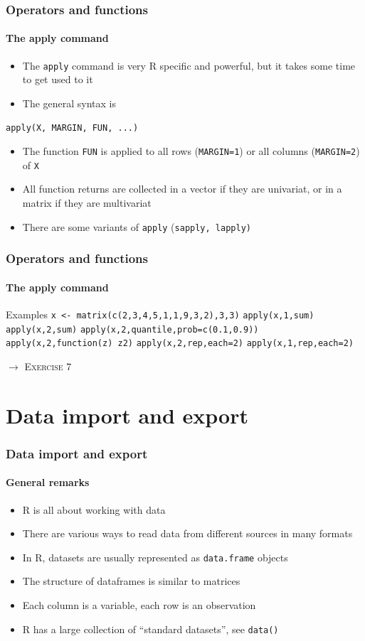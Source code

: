 \documentclass[title={Introduction to R}, author={Mutschler and Zaharieva}, inst={Institute for Econometrics and Empirical Economics}]{beamer}
\begin{document}
\begin{frame}
\frametitle{Operators and functions}
\framesubtitle{The apply command}
\begin{itemize}
\item The \texttt{apply} command is very R specific and powerful, but it takes some time to get used to it
\item The general syntax is
\end{itemize}
\begin{center}
\texttt{apply(X, MARGIN, FUN, ...)}
\end{center}

\begin{itemize}
\item The function \texttt{FUN} is applied to all rows (\texttt{MARGIN=1})
or all columns (\texttt{MARGIN=2}) of \texttt{X}
\item All function returns are collected in a vector if they are univariat,
or in a matrix if they are multivariat
\item There are some variants of \texttt{apply} (\texttt{sapply, lapply)}
\end{itemize}
\end{frame}


\begin{frame}
\frametitle{Operators and functions}
\framesubtitle{The apply command}
\begin{block}{Examples}
\texttt{x <- matrix(c(2,3,4,5,1,1,9,3,2),3,3)}\newline
\texttt{apply(x,1,sum)}\newline
\texttt{apply(x,2,sum)}\newline
\texttt{apply(x,2,quantile,prob=c(0.1,0.9))}\newline
\texttt{apply(x,2,function(z) z2)}\newline
\texttt{apply(x,2,rep,each=2)}\newline
\texttt{apply(x,1,rep,each=2)}
\end{block}\pause
$\longrightarrow $ \textsc{Exercise 7}
\end{frame}


\section{Data import and export}
\begin{frame}
\frametitle{Data import and export}
\framesubtitle{General remarks}
\begin{itemize}
\item R is all about working with data
\item There are various ways to read data from different sources in many
formats
\item In R, datasets are usually represented as \texttt{data.frame} objects
\item The structure of dataframes is similar to matrices
\item Each column is a variable, each row is an observation
\item R has a large collection of \textquotedblleft standard
datasets\textquotedblright , see \texttt{data()}
\end{itemize}
\end{frame}
\end{document}
